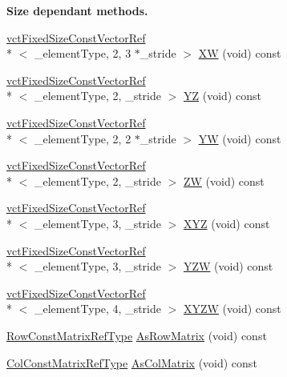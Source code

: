 \begin{Indent}{\bf Size dependant methods.}
\begin{DoxyCompactItemize}
\item 
\hyperlink{classvct_fixed_size_const_vector_ref}{vct\-Fixed\-Size\-Const\-Vector\-Ref}\\*
$<$ \-\_\-element\-Type, 2, 3 $\ast$\-\_\-stride $>$ \hyperlink{classvct_fixed_size_const_vector_base_aaaf0bfafb4c463a8e80529292c78263e}{X\-W} (void) const 
\item 
\hyperlink{classvct_fixed_size_const_vector_ref}{vct\-Fixed\-Size\-Const\-Vector\-Ref}\\*
$<$ \-\_\-element\-Type, 2, \-\_\-stride $>$ \hyperlink{classvct_fixed_size_const_vector_base_a3b919c98160f6d0b27d114155d24e5d1}{Y\-Z} (void) const 
\item 
\hyperlink{classvct_fixed_size_const_vector_ref}{vct\-Fixed\-Size\-Const\-Vector\-Ref}\\*
$<$ \-\_\-element\-Type, 2, 2 $\ast$\-\_\-stride $>$ \hyperlink{classvct_fixed_size_const_vector_base_ac1c376d6a306b27fb8cb655f0092d57f}{Y\-W} (void) const 
\item 
\hyperlink{classvct_fixed_size_const_vector_ref}{vct\-Fixed\-Size\-Const\-Vector\-Ref}\\*
$<$ \-\_\-element\-Type, 2, \-\_\-stride $>$ \hyperlink{classvct_fixed_size_const_vector_base_ae712b316e450452ba6603329c9418237}{Z\-W} (void) const 
\item 
\hyperlink{classvct_fixed_size_const_vector_ref}{vct\-Fixed\-Size\-Const\-Vector\-Ref}\\*
$<$ \-\_\-element\-Type, 3, \-\_\-stride $>$ \hyperlink{classvct_fixed_size_const_vector_base_ad3c02fe9042d5bb8b4a92e51bb3869da}{X\-Y\-Z} (void) const 
\item 
\hyperlink{classvct_fixed_size_const_vector_ref}{vct\-Fixed\-Size\-Const\-Vector\-Ref}\\*
$<$ \-\_\-element\-Type, 3, \-\_\-stride $>$ \hyperlink{classvct_fixed_size_const_vector_base_a4c6e3b73735612f6253cb1bbfa0a485f}{Y\-Z\-W} (void) const 
\item 
\hyperlink{classvct_fixed_size_const_vector_ref}{vct\-Fixed\-Size\-Const\-Vector\-Ref}\\*
$<$ \-\_\-element\-Type, 4, \-\_\-stride $>$ \hyperlink{classvct_fixed_size_const_vector_base_ae2b5ae2687bab88d80caf5becdd8a058}{X\-Y\-Z\-W} (void) const 
\end{DoxyCompactItemize}
\end{Indent}
{\bf }\par
\begin{DoxyCompactItemize}
\item 
\hyperlink{classvct_fixed_size_const_vector_base_ab7c118dbf79db9194157ced0e4549814}{Row\-Const\-Matrix\-Ref\-Type} \hyperlink{classvct_fixed_size_const_vector_base_aca37c653fd919f86d4c4950ea4ff1737}{As\-Row\-Matrix} (void) const 
\item 
\hyperlink{classvct_fixed_size_const_vector_base_a7dd213f3b90969b8c89fd0766cf0a70e}{Col\-Const\-Matrix\-Ref\-Type} \hyperlink{classvct_fixed_size_const_vector_base_ac13901448b8758b416bfa26d5deba10d}{As\-Col\-Matrix} (void) const 
\end{DoxyCompactItemize}

